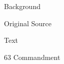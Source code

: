 			\begin{description}
				\item[Background]
			\end{description}
			
			
			\begin{description}
				\item[Original Source]
			\end{description}
			
			
			\begin{description}
				\item[Text]
			\end{description}
			
				\begin{tightcenter}
				63 Commandment
				\end{tightcenter}
				
